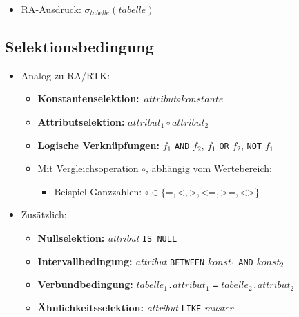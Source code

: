 			\begin{itemize}
				\item RA-Ausdruck: \( \sigma _ \textit{tabelle} (\textit{tabelle}) \)
			\end{itemize}

		\subsection{Selektionsbedingung} %
			\begin{itemize}
				\item Analog zu RA/RTK:
					\begin{itemize}
						\item \textbf{Konstantenselektion:} \( \textit{attribut} \circ \textit{konstante} \)
						\item \textbf{Attributselektion:} \( \textit{attribut}_1 \circ \textit{attribut}_2 \)
						\item \textbf{Logische Verknüpfungen:} \(f_1\) \lstinline|AND| \(f_2\), \(f_1\) \lstinline|OR| \(f_2\), \lstinline|NOT| \(f_1\)
						\item Mit Vergleichsoperation \(\circ\), abhängig vom Wertebereich:
							\begin{itemize}
								\item Beispiel Ganzzahlen: \( \circ \in \{ \texttt{=}, \texttt{<}, \texttt{>}, \texttt{<=}, \texttt{>=}, \texttt{<>} \} \)
							\end{itemize}
					\end{itemize}
				\item Zusätzlich:
					\begin{itemize}
						\item \textbf{Nullselektion:} \textit{attribut} \lstinline|IS NULL|
						\item \textbf{Intervallbedingung:} \textit{attribut} \lstinline|BETWEEN| \(\textit{konst}_1\) \lstinline|AND| \(\textit{konst}_2\)
						\item \textbf{Verbundbedingung:} \(\textit{tabelle}_1\)\lstinline|.|\(\textit{attribut}_1\) \lstinline|=| \(\textit{tabelle}_2\)\lstinline|.|\(\textit{attribut}_2\)
						\item \textbf{Ähnlichkeitsselektion:} \textit{attribut} \lstinline|LIKE| \textit{muster}
					\end{itemize}
			\end{itemize}


